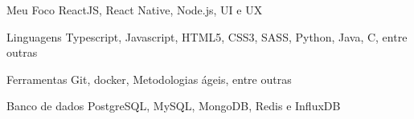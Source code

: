 
\begin{cvskills}
  \cvskill
    {Meu Foco}
    {ReactJS, React Native, Node.js, UI e UX}
  
  \cvskill
    {Linguagens}
    {Typescript, Javascript, HTML5, CSS3, SASS, Python, Java, C, entre outras}

  \cvskill
    {Ferramentas}
    {Git, docker, Metodologias ágeis, entre outras}

  \cvskill
    {Banco de dados}
    {PostgreSQL, MySQL, MongoDB, Redis e InfluxDB}
    
\end{cvskills}
